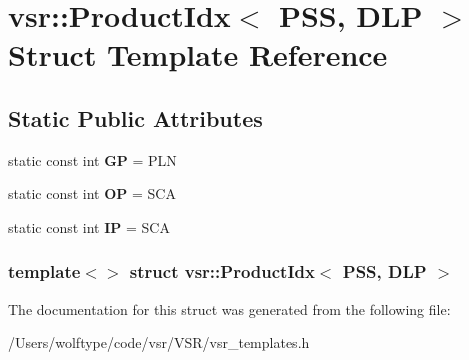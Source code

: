 \hypertarget{structvsr_1_1_product_idx_3_01_p_s_s_00_01_d_l_p_01_4}{\section{vsr\-:\-:Product\-Idx$<$ P\-S\-S, D\-L\-P $>$ Struct Template Reference}
\label{structvsr_1_1_product_idx_3_01_p_s_s_00_01_d_l_p_01_4}
}
\subsection*{Static Public Attributes}
\begin{DoxyCompactItemize}
\item 
\hypertarget{structvsr_1_1_product_idx_3_01_p_s_s_00_01_d_l_p_01_4_adaca0b8bc372ffa9b1e81e56f41198f3}{static const int {\bfseries G\-P} = P\-L\-N}\label{structvsr_1_1_product_idx_3_01_p_s_s_00_01_d_l_p_01_4_adaca0b8bc372ffa9b1e81e56f41198f3}

\item 
\hypertarget{structvsr_1_1_product_idx_3_01_p_s_s_00_01_d_l_p_01_4_a686c3183a7369ca94cc14db7139348e3}{static const int {\bfseries O\-P} = S\-C\-A}\label{structvsr_1_1_product_idx_3_01_p_s_s_00_01_d_l_p_01_4_a686c3183a7369ca94cc14db7139348e3}

\item 
\hypertarget{structvsr_1_1_product_idx_3_01_p_s_s_00_01_d_l_p_01_4_ada3a0157306339a43b87ff065e42d2ac}{static const int {\bfseries I\-P} = S\-C\-A}\label{structvsr_1_1_product_idx_3_01_p_s_s_00_01_d_l_p_01_4_ada3a0157306339a43b87ff065e42d2ac}

\end{DoxyCompactItemize}
\subsubsection*{template$<$$>$ struct vsr\-::\-Product\-Idx$<$ P\-S\-S, D\-L\-P $>$}



The documentation for this struct was generated from the following file\-:\begin{DoxyCompactItemize}
\item 
/\-Users/wolftype/code/vsr/\-V\-S\-R/vsr\-\_\-templates.\-h\end{DoxyCompactItemize}
